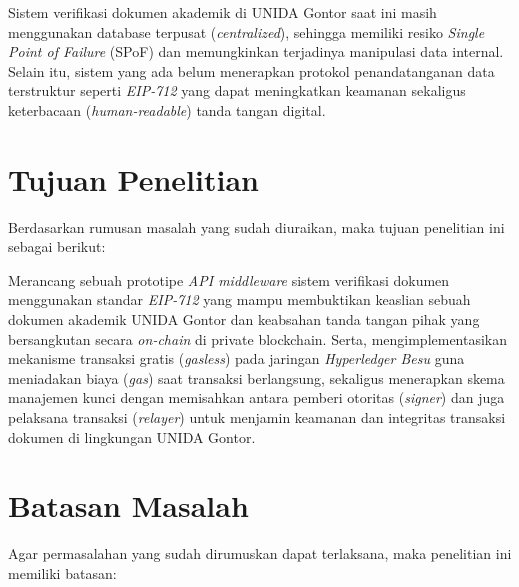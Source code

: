 	\begin{secenumerate}
		\item Sistem verifikasi dokumen akademik di UNIDA Gontor saat ini masih menggunakan database terpusat (\textit{centralized}), sehingga memiliki resiko \textit{Single Point of Failure} (SPoF) dan memungkinkan terjadinya manipulasi data internal. Selain itu, sistem yang ada belum menerapkan protokol penandatanganan data terstruktur seperti \textit{EIP-712} yang dapat meningkatkan keamanan sekaligus keterbacaan (\textit{human-readable}) tanda tangan digital. 

	\end{secenumerate}
	
	\section{Tujuan Penelitian}
	Berdasarkan rumusan masalah yang sudah diuraikan, maka tujuan penelitian ini sebagai berikut:

	\begin{secenumerate}
		\item Merancang sebuah prototipe \textit{API middleware} sistem verifikasi dokumen menggunakan standar \textit{EIP-712} yang  mampu membuktikan keaslian sebuah dokumen akademik UNIDA Gontor dan keabsahan tanda tangan pihak yang bersangkutan secara \textit{on-chain} di private blockchain. Serta, mengimplementasikan mekanisme transaksi gratis (\textit{gasless}) pada jaringan \textit{Hyperledger Besu} guna meniadakan biaya (\textit{gas}) saat transaksi berlangsung, sekaligus menerapkan skema manajemen kunci dengan memisahkan antara pemberi otoritas (\textit{signer}) dan juga pelaksana transaksi (\textit{relayer}) untuk menjamin keamanan dan integritas transaksi dokumen di lingkungan UNIDA Gontor.

	\end{secenumerate}

	\section{Batasan Masalah}
	Agar permasalahan yang sudah dirumuskan dapat terlaksana, maka penelitian ini memiliki batasan:

